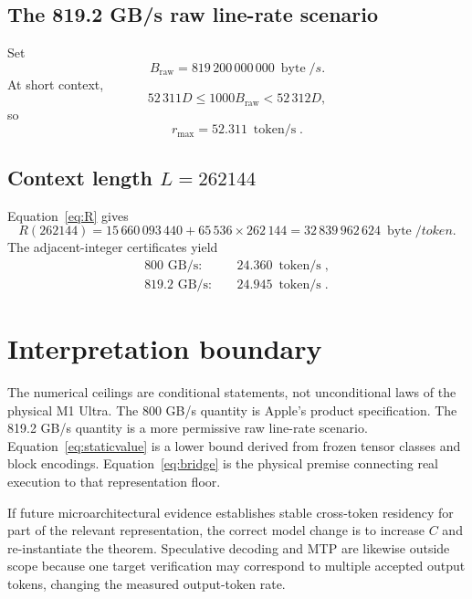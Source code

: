 \documentclass[11pt,a4paper]{article}
\newcommand{\bytes}{\operatorname{byte}}
\newcommand{\tps}{\operatorname{token/s}}
\begin{document}
\subsection{The 819.2 GB/s raw line-rate scenario}
Set
\[
B_{\mathrm{raw}}=819\,200\,000\,000\ \bytes/s.
\]
At short context,
\begin{equation}
52\,311D\le1000B_{\mathrm{raw}}<52\,312D,
\end{equation}
so
\begin{equation}
  \boxed{r_{\max}=52.311\ \tps}.
\end{equation}

\subsection{Context length $L=262144$}
Equation~\eqref{eq:R} gives
\begin{equation}
R(262144)
=15\,660\,093\,440+65\,536\times262\,144
=32\,839\,962\,624\ \bytes/token.
\end{equation}
The adjacent-integer certificates yield
\begin{equation}
\boxed{
\begin{aligned}
800\text{ GB/s}:&\quad24.360\ \tps,\\
819.2\text{ GB/s}:&\quad24.945\ \tps.
\end{aligned}}
\end{equation}

\section{Interpretation boundary}

The numerical ceilings are conditional statements, not unconditional laws of the physical M1 Ultra. The 800 GB/s quantity is Apple's product specification. The 819.2 GB/s quantity is a more permissive raw line-rate scenario. Equation~\eqref{eq:staticvalue} is a lower bound derived from frozen tensor classes and block encodings. Equation~\eqref{eq:bridge} is the physical premise connecting real execution to that representation floor.

If future microarchitectural evidence establishes stable cross-token residency for part of the relevant representation, the correct model change is to increase $C$ and re-instantiate the theorem. Speculative decoding and MTP are likewise outside scope because one target verification may correspond to multiple accepted output tokens, changing the measured output-token rate.
\end{document}

